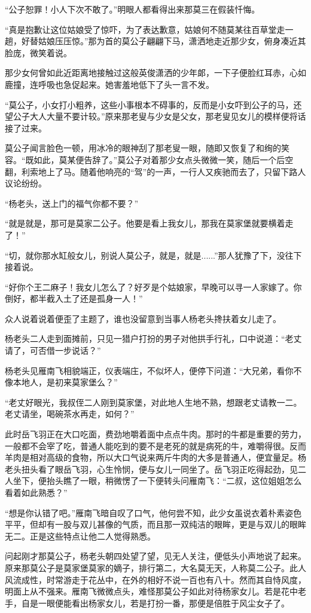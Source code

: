 “公子恕罪！小人下次不敢了。”明眼人都看得出来那莫三在假装忏悔。

“真是抱歉让这位姑娘受了惊吓，为了表达歉意，姑娘何不随莫某往百草堂走一趟，好替姑娘压压惊。”那为首的莫公子翩翩下马，潇洒地走近那少女，俯身凑近其脸庞，微笑着说。

那少女何曾如此近距离地接触过这般英俊潇洒的少年郞，一下子便脸红耳赤，心如鹿撞，连呼吸也急促起来。她害羞地低下了头一言不发。

“莫公子，小女打小粗养，这些小事根本不碍事的，反而是小女吓到公子的马，还望公子大人大量不要计较。”原来那老叟与少女是父女，那老叟见女儿的模样便将话接了过来。

莫公子闻言脸色一顿，用冰冷的眼神刮了那老叟一眼，随即又恢复了和绚的笑容。“既如此，莫某便告辞了。”莫公子对着那少女点头微微一笑，随后一个后空翻，利索地上了马。随着他响亮的“驾”的一声，一行人又疾驰而去了，只留下路人议论纷纷。

“杨老头，送上门的福气你都不要？”

“就是就是，那可是莫家二公子。他要是看上我女儿，那我在莫家堡就要横着走了！”

“切，就你那水缸般女儿，别说人莫公子，就是，就是......”那人犹豫了下，没往下接着说。

“好你个王二麻子！我女儿怎么了？好歹是个姑娘家，早晚可以寻一人家嫁了。你倒好，都半截入土了还是孤身一人！”

众人说着说着便歪了主题了，谁也没留意到当事人杨老头搀扶着女儿走了。

杨老头二人走到面摊前，只见一猎户打扮的男子对他拱手行礼，口中说道：“老丈请了，可否借一步说话？”

杨老头见雁南飞相貌端正，仪表端庄，不似坏人，便停下问道：“大兄弟，看你不像本地人，是初来莫家堡么？”

“老丈好眼光，我叔侄二人刚到莫家堡，对此地人生地不熟，想跟老丈请教一二。老丈请坐，喝碗茶水再走，如何？”

此时岳飞羽正在大口吃面，费劲地嚼着面中点点牛肉。那时的牛都是重要的劳力，一般都不会宰了吃，普通人能吃到的要不是老死的就是病死的牛，难嚼得很。反而羊肉是相对高级的食物，所以大口气说来两斤牛肉的大多是普通人，便宜量足。杨老头扭头看了眼岳飞羽，心生怜悯，便与女儿一同坐了。岳飞羽正吃得起劲，见二人坐下，便抬头瞧了一眼，稍微愣了一下便转头问雁南飞：“二叔，这位姐姐怎么看着如此熟悉？”

“想是你认错了吧。”雁南飞暗自叹了口气，他何尝不知，此少女虽说衣着朴素姿色平平，但却有一股与双儿甚像的气质，而且那一双纯洁的眼眸，更是与双儿的眼眸无二。正是这些特点让他二人觉得熟悉。

问起刚才那莫公子，杨老头朝四处望了望，见无人关注，便低头小声地说了起来。原来那莫公子是莫家堡莫家的嫡子，排行第二，大名莫无天，人称莫二公子。此人风流成性，时常游走于花丛中，在外的相好不说一百也有八十。然而其自恃风度，明面上从不强来。雁南飞微微点头，难怪那莫公子如此对待杨家女儿。若是花中老手，自是一眼便能看出杨家女儿，若是打扮一番，那便是倍胜于风尘女子了。

